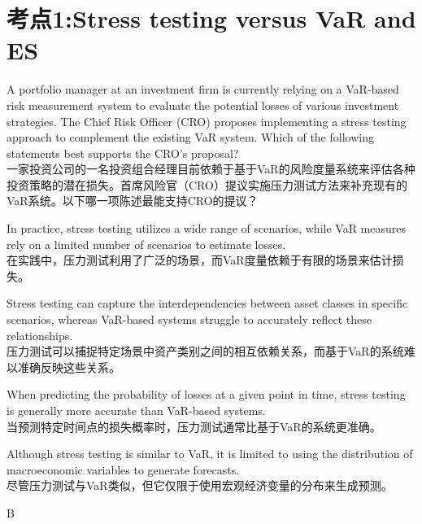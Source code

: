 \documentclass{article}
\newcounter{question} %
\begin{document}
 \tableofcontents %
\newpage

\iftrue
\section{考点1:Stress testing versus VaR and ES}
\setcounter{question}{0}


\begin{question}
    A portfolio manager at an investment firm is currently relying on a VaR-based risk measurement system to evaluate the potential losses of various investment strategies. The Chief Risk Officer (CRO) proposes implementing a stress testing approach to complement the existing VaR system. Which of the following statements best supports the CRO's proposal?\\
    一家投资公司的一名投资组合经理目前依赖于基于VaR的风险度量系统来评估各种投资策略的潜在损失。首席风险官（CRO）提议实施压力测试方法来补充现有的VaR系统。以下哪一项陈述最能支持CRO的提议？
\end{question}
\begin{choices}
    \item In practice, stress testing utilizes a wide range of scenarios, while VaR measures rely on a limited number of scenarios to estimate losses.\\
    在实践中，压力测试利用了广泛的场景，而VaR度量依赖于有限的场景来估计损失。
    \item Stress testing can capture the interdependencies between asset classes in specific scenarios, whereas VaR-based systems struggle to accurately reflect these relationships.\\
    压力测试可以捕捉特定场景中资产类别之间的相互依赖关系，而基于VaR的系统难以准确反映这些关系。
    \item When predicting the probability of losses at a given point in time, stress testing is generally more accurate than VaR-based systems.\\
    当预测特定时间点的损失概率时，压力测试通常比基于VaR的系统更准确。
    \item Although stress testing is similar to VaR, it is limited to using the distribution of macroeconomic variables to generate forecasts.\\
    尽管压力测试与VaR类似，但它仅限于使用宏观经济变量的分布来生成预测。
\end{choices}

\begin{correctanswer}
    B
\end{correctanswer}
\end{document}
